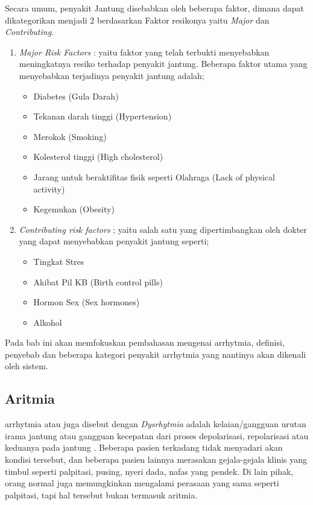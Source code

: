 Secara umum, penyakit Jantung disebabkan oleh beberapa faktor, dimana dapat 
dikategorikan menjadi 2 berdasarkan Faktor resikonya yaitu  \textit{Major} dan
\textit{Contributing}.
\begin{enumerate}
    \item \textit{Major Risk Factors} : yaitu faktor yang telah terbukti 
    menyebabkan meningkatnya resiko terhadap penyakit jantung.  Beberapa faktor
    utama yang menyebabkan terjadinya penyakit jantung adalah;
	\begin{itemize}
	    \setlength{\itemsep}{1pt}
  		\setlength{\parskip}{0pt}
  		\setlength{\parsep}{0pt}
	    \item Diabetes (Gula Darah)
	    \item Tekanan darah tinggi (Hypertension)
	    \item Merokok (Smoking)
	    \item Kolesterol tinggi (High cholesterol)
	    \item Jarang untuk beraktifitas fisik seperti Olahraga  (Lack of physical
	    activity)
	    \item Kegemukan (Obesity)
	\end{itemize}

	\item \textit{Contributing risk factors} ; yaitu salah satu  yang
	dipertimbangkan oleh dokter yang dapat menyebabkan penyakit jantung seperti;
	\begin{itemize}
	  	\setlength{\itemsep}{1pt}
		\setlength{\parskip}{0pt}
  		\setlength{\parsep}{0pt}
	    \item Tingkat Stres
	    \item Akibat Pil KB (Birth control pills)
	    \item Hormon Sex (Sex hormones)
	    \item Alkohol
	\end{itemize}
\end{enumerate}

Pada bab ini \saya akan memfokuskan pembahasan
mengenai arrhytmia, definisi, penyebab dan beberapa kategori penyakit arrhytmia
yang nantinya akan dikenali oleh sistem.

\subsection{Aritmia}
\label{ssec:aritmia}
\Gls{arrhytmia} atau juga disebut dengan \emph{Dysrhytmia} adalah
kelaian/gangguan urutan irama jantung atau gangguan kecepatan dari proses depolarisasi, repolarisasi
atau keduanya pada jantung \cite{Karim:1996}. Beberapa pasien terkadang tidak
menyadari akan kondisi tersebut, dan beberapa pasien lainnya merasakan
gejala-gejala klinis yang timbul seperti \gls{palpitasi}, pusing, nyeri dada,
nafas yang pendek. Di lain pihak, orang normal juga memungkinkan mengalami perasaan
yang sama seperti \gls{palpitasi}, tapi hal tersebut bukan termasuk aritmia.

